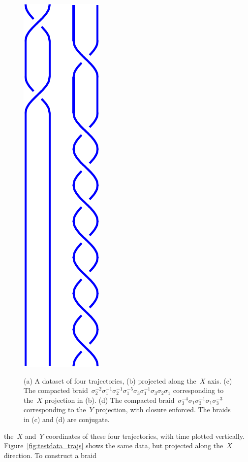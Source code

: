 \documentclass[12pt]{article}
\begin{document}
\begin{figure}
\begin{center}
{  \includegraphics[height=.3\textheight]{testdata_braidY}
  \label{fig:testdata_braidY}
}
\end{center}
\caption{(a) A dataset of four trajectories, (b) projected along the~$X$ axis.
  (c) The compacted braid~$ \sigma_2^{-2} \sigma_1^{-1} \sigma_2^{-1}
  \sigma_1^{-5} \sigma_3 \sigma_1^{-1}\sigma_3\sigma_2\sigma_1$ corresponding
  to the~$X$ projection in (b).  (d) The compacted
  braid~$\sigma_3^{-4}\sigma_1\sigma_3^{-1}\sigma_1\sigma_3^{-3}$
  corresponding to the~$Y$ projection, with closure enforced. %
  The braids in (c) and (d) are conjugate.}
\end{figure}
%
the~$X$ and~$Y$ coordinates of these four trajectories, with time
plotted vertically.  Figure~\ref{fig:testdata_trajs} shows the same
data, but projected along the~$X$ direction.  To construct a braid
\end{document}
